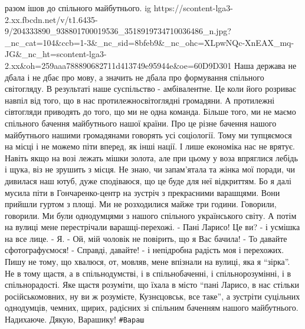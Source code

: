 разом ішов до спільного майбутнього. 
\smallskip
\ifcmt
  ig https://scontent-lga3-2.xx.fbcdn.net/v/t1.6435-9/204333890_938801700019536_3518919734710036486_n.jpg?_nc_cat=104&ccb=1-3&_nc_sid=8bfeb9&_nc_ohc=XLpwNQc-XnEAX_mq-JG&_nc_ht=scontent-lga3-2.xx&oh=259aaa788890682711d413749e95944e&oe=60D9D301
\fi
\smallskip
Наша держава не дбала і не дбає про мову, а значить не дбала про формування спільного світогляду. В результаті наше суспільство - амбівалентне. Це коли його розриває навпіл від того, що в нас протилежносвітоглядні громадяни. А протилежні сівтогляди приводять до того, що ми не одна команда. Більше того, ми не маємо спільного бачення майбутнього нашої країни. Про це різне бачення нашого майбутнього нашими громадянами говорять усі соціології. Тому ми тупцяємося на місці і не можемо піти вперед, як інші нації. І лише економіка нас не врятує. Навіть якщо на возі лежать мішки золота, але при цьому у воза впряглися лебідь і щука, віз не зрушить з місця. 
Не знаю, чи запам'ятала та жінка мої поради, чи дивилася наш ютуб, дуже сподіваюся, що це буде для неї відкриттям. 
\smallskip
Бо я далі мусила піти в Гончаренко-центр на зустріч з прекрасними варашцями.
Вони прийшли гуртом з площі. Ми не розходилися майже три години. Говорили,
говорили. Ми були однодумцями з нашого спільного українського світу.  
\smallskip
А потім на вулиці мене перестрічали варашці-перехожі. 
\smallskip
- Пані Ларисо! Це ви? - і усмішка на все лице.
- Я.
- Ой, мій чоловік не повірить, що я Вас бачила! 
- То давайте сфотографуємося!
- Справді, давайте! - і непідробна радість моя і перехожих.
\smallskip
Пишу не тому, що хвалюся, от, мовляв, мене впізнали на вулиці, яка я \enquote{зірка}.
Не в тому щастя, а в спільнодумстві, і в спільнобаченні, і спільнорозумінні, і
в спільнорадості.  Яке щастя розуміти, що їхала в місто \enquote{пані Ларисо, в нас
стільки російськомовних, ну ви ж розумієте, Кузнєцовськ, все таке}, а зустріти
суцільних однодумців, чемних, щирих, радісних зі спільним баченням нашого
майбутнього.  
\smallskip
Надихаюче.
\smallskip
Дякую, Варашику!
\restorecr
\verb|#Вараш|
